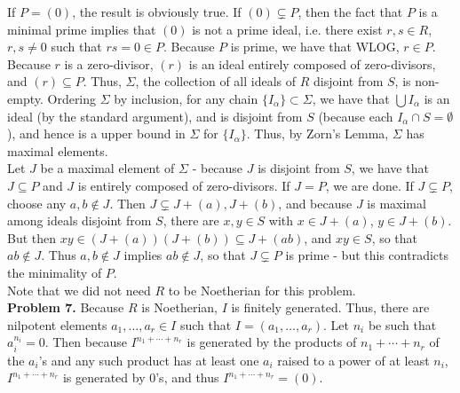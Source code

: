 \documentclass[11pt]{article}
\newcommand{\num}[1]{\noindent \textbf{#1}}
\theoremstyle{definition}
\begin{document}
\noindent If $P=(0)$, the result is obviously true. If $(0)\subsetneq P$,
then the fact that $P$ is a minimal prime implies that $(0)$ is not a
prime ideal, i.e. there exist $r,s\in R$, $r,s\neq0$ such that $rs=0\in
P$. Because $P$ is prime, we have that WLOG, $r\in P$. Because $r$ is a
zero-divisor, $(r)$ is an ideal entirely composed of zero-divisors, and
$(r)\subseteq P$.  Thus, $\Sigma$, the collection of all ideals of $R$
disjoint from $S$, is non-empty. Ordering $\Sigma$ by inclusion, for any
chain $\{I_\alpha\}\subset \Sigma$, we have that $\bigcup I_\alpha$ is an
ideal (by the standard argument), and is disjoint from $S$ (because each
$I_\alpha\cap S=\emptyset$), and hence is a upper bound in $\Sigma$ for
$\{I_\alpha\}$. Thus, by Zorn's Lemma, $\Sigma$ has maximal elements.\\

\noindent Let $J$ be a maximal element of $\Sigma$ - because $J$ is
disjoint from $S$, we have that $J\subseteq P$ and $J$ is entirely composed
of zero-divisors. If $J=P$, we are done. If $J\subsetneq P$, choose any
$a,b\notin J$. Then $J\subsetneq J+(a),J+(b)$, and because $J$ is maximal
among ideals disjoint from $S$, there are $x,y\in S$ with $x\in J+(a)$,
$y\in J+(b)$. But then $xy\in (J+(a))(J+(b))\subseteq J+(ab)$, and $xy\in
S$, so that $ab\notin J$. Thus $a,b\notin J$ implies $ab\notin J$, so that
$J\subsetneq P$ is prime - but this contradicts the minimality of $P$.\\

\noindent Note that we did not need $R$ to be Noetherian for this problem.\\

\num{Problem 7.} Because $R$ is Noetherian, $I$ is finitely generated. Thus,
there are nilpotent elements $a_1,\ldots,a_r\in I$ such that
$I=(a_1,\ldots,a_r)$. Let $n_i$ be such that $a_i^{n_i}=0$. Then because
$I^{n_1+\cdots+n_r}$ is generated by the products of $n_1+\cdots+n_r$ of
the $a_i$'s and any such product has at least one $a_i$ raised to a power
of at least $n_i$, $I^{n_1+\cdots+n_r}$ is generated by 0's, and thus
$I^{n_1+\cdots+n_r}=(0)$.
\end{document}

